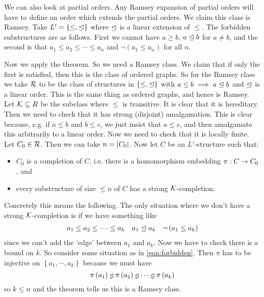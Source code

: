 \documentclass{amsart}
\begin{document}
\begin{exm}
We can also look at partial orders. 
Any Ramsey expansion of partial orders will have to define an order which extends the
partial orders. We claim this class is Ramsey. Take $L' = \left\{ \leq , \trianglelefteq \right\}$
where $\trianglelefteq$ is a linear extension of $\leq$.
The forbidden substructures are as follows. First we cannot have $a\geq b$, $a\trianglelefteq b$
for $a\neq b$, and the second is that $a_1 \leq a_2 \leq \cdots\leq a_n$ and $\neg \left(
a_1\leq a_n \right)$ for all $n$.

Now we apply the theorem. So we need a Ramsey class. 
We claim that if only the first is satisfied, then this is the class of ordered graphs. 
So for the Ramsey class we take $\mathcal{R}$ to be the class of structures in $\left\{ \leq ,
\trianglelefteq\right\}$ with $a\leq b\implies a\trianglelefteq b$ and $\trianglelefteq$ is a linear order. This is
the same thing as ordered graphs, and hence is Ramsey.
Let $\mathcal{K}\subseteq R$ be the subclass where $\leq$ is transitive. 
It is clear that it is hereditary. Then we need to check that it has
strong (disjoint) amalgamation. This is clear because, e.g. if $a\leq b$ and $b\leq c$, we
just insist that $a\leq c$, and then amalgamate this arbitrarily to a linear order. 
Now we need to check that it is locally finite. Let $C_0\in \mathcal{R}$. Then we can take $n =
\left| C_0 \right|$. Now let $C$ be an $L'$-structure such that:
\begin{itemize}
\item $C_0$ is a completion of $C$, i.e. there is
a homomorphism embedding $\pi:C\rightarrow C_0$, and
\item every substructure of size $\leq n$ of $C$ has a strong $\mathcal{K}$-completion.
\end{itemize}
Concretely this means the following. The only situation where we don't have a strong
$\mathcal{K}$-completion is if we have something like
\begin{align}
a_1 \leq a_2 \leq \cdots \leq a_k &&
a_1 \trianglelefteq a_k &&
\neg\left( a_1 \leq a_k \right)
\label{eqn:forbidden}
\end{align}
since we can't add the `edge' between $a_1$ and $a_k$.
Now we have to check there is a bound on $k$.
So consider some situation as in \eqref{eqn:forbidden}. Then $\pi$ has to be injective on
$\left\{ a_1 , \cdots , a_k \right\}$ because we must have
\begin{equation}
\pi\left( a_1 \right) \sorderl \pi\left( a_2 \right) \sorderl \cdots \sorderl \pi\left( a_k \right)
\end{equation}
so $k\leq n$ and the theorem tells us this is a Ramsey class.
\end{exm}
\end{document}

